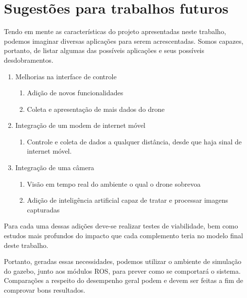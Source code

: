 \documentclass[12pt,a4paper,oneside]{book}
\begin{document}

\chapter{Sugestões para trabalhos futuros}
%
\thispagestyle{empty} 
%
%
Tendo em mente as características do projeto apresentadas neste trabalho, podemos imaginar diversas aplicações para serem acrescentadas. Somos capazes, portanto, de listar algumas das possíveis aplicações e seus possíveis desdobramentos.
%
\begin{enumerate}
    \item Melhorias na interface de controle 
        \begin{enumerate}
            \item Adição de novos funcionalidades
            \item Coleta e apresentação de mais dados do drone  
        \end{enumerate}
    \item Integração de um modem de internet móvel
        \begin{enumerate}
            \item Controle e coleta de dados a qualquer distância, desde que haja sinal de internet móvel.
        \end{enumerate}
    \item Integração de uma câmera
        \begin{enumerate}
            \item Visão em tempo real do ambiente o qual o drone sobrevoa
            \item Adição de inteligência artificial capaz de tratar e processar imagens capturadas
        \end{enumerate}
\end{enumerate}

Para cada uma dessas adições deve-se realizar testes de viabilidade, bem como estudos mais profundos do impacto que cada complemento teria no modelo final deste trabalho. 

Portanto, geradas essas necessidades, podemos utilizar o ambiente de simulação do gazebo, junto aos módulos ROS, para prever como se comportará o sistema. Comparações a respeito do desempenho geral podem e devem ser feitas a fim de comprovar bons resultados.
\end{document}
